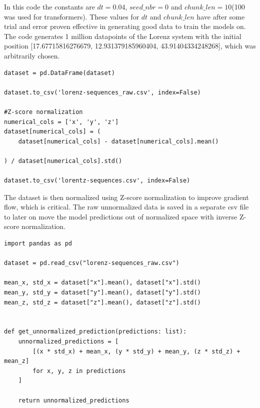 \documentclass[11pt]{article}
\begin{document}
In this code the constants are $dt = 0.04$, $seed\_nbr = 0$ and $chunk\_len = 10$(100 was used for transformers). These values for $dt$ and $chunk\_len$ have after some trial and error proven effective in generating good data to train the models on. The code generates 1 million datapoints of the Lorenz system with the initial position [17.67715816276679, 12.931379185960404, 43.91404334248268], which was arbitrarily chosen. 

\begin{lstlisting}
dataset = pd.DataFrame(dataset)

dataset.to_csv('lorenz-sequences_raw.csv', index=False)

#Z-score normalization
numerical_cols = ['x', 'y', 'z']
dataset[numerical_cols] = (
    dataset[numerical_cols] - dataset[numerical_cols].mean()

) / dataset[numerical_cols].std()

dataset.to_csv('lorentz-sequences.csv', index=False)
\end{lstlisting}

The dataset is then normalized using Z-score normalization to improve gradient flow, which is critical. The raw unnormalized data is saved in a separate csv file to later on move the model predictions out of normalized space with inverse Z-score normalization. 

\begin{lstlisting}
import pandas as pd

dataset = pd.read_csv("lorenz-sequences_raw.csv")

mean_x, std_x = dataset["x"].mean(), dataset["x"].std()
mean_y, std_y = dataset["y"].mean(), dataset["y"].std()
mean_z, std_z = dataset["z"].mean(), dataset["z"].std()


def get_unnormalized_prediction(predictions: list):
    unnormalized_predictions = [
        [(x * std_x) + mean_x, (y * std_y) + mean_y, (z * std_z) + mean_z]
        for x, y, z in predictions
    ]

    return unnormalized_predictions
\end{lstlisting}
\end{document}
